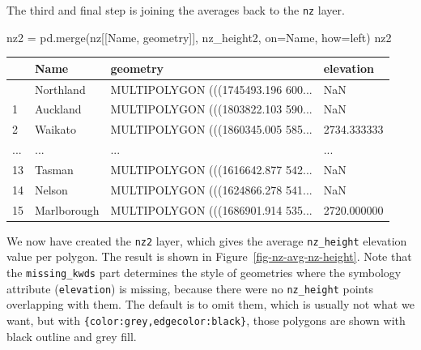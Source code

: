\documentclass[
  letterpaper,
]{krantz}
\newenvironment{Shaded}{\begin{snugshade}}{\end{snugshade}}
\newcommand{\NormalTok}[1]{\textcolor[rgb]{0.00,0.23,0.31}{#1}}
\newcommand{\OperatorTok}[1]{\textcolor[rgb]{0.37,0.37,0.37}{#1}}
\newcommand{\StringTok}[1]{\textcolor[rgb]{0.13,0.47,0.30}{#1}}
\begin{document}
The third and final step is joining the averages back to the \texttt{nz}
layer.

\begin{Shaded}
\begin{Highlighting}[]
\NormalTok{nz2 }\OperatorTok{=}\NormalTok{ pd.merge(nz[[}\StringTok{\textquotesingle{}Name\textquotesingle{}}\NormalTok{, }\StringTok{\textquotesingle{}geometry\textquotesingle{}}\NormalTok{]], nz\_height2, on}\OperatorTok{=}\StringTok{\textquotesingle{}Name\textquotesingle{}}\NormalTok{, how}\OperatorTok{=}\StringTok{\textquotesingle{}left\textquotesingle{}}\NormalTok{)}
\NormalTok{nz2}
\end{Highlighting}
\end{Shaded}

\begin{longtable}[]{@{}llll@{}}
\toprule\noalign{}
& Name & geometry & elevation \\
\midrule\noalign{}
\endhead
\bottomrule\noalign{}
\endlastfoot
0 & Northland & MULTIPOLYGON (((1745493.196 600... & NaN \\
1 & Auckland & MULTIPOLYGON (((1803822.103 590... & NaN \\
2 & Waikato & MULTIPOLYGON (((1860345.005 585... & 2734.333333 \\
... & ... & ... & ... \\
13 & Tasman & MULTIPOLYGON (((1616642.877 542... & NaN \\
14 & Nelson & MULTIPOLYGON (((1624866.278 541... & NaN \\
15 & Marlborough & MULTIPOLYGON (((1686901.914 535... & 2720.000000 \\
\end{longtable}

We now have created the \texttt{nz2} layer, which gives the average
\texttt{nz\_height} elevation value per polygon. The result is shown in
Figure~\ref{fig-nz-avg-nz-height}. Note that the \texttt{missing\_kwds}
part determines the style of geometries where the symbology attribute
(\texttt{elevation}) is missing, because there were no
\texttt{nz\_height} points overlapping with them. The default is to omit
them, which is usually not what we want, but with
\texttt{\{\textquotesingle{}color\textquotesingle{}:\textquotesingle{}grey\textquotesingle{},\textquotesingle{}edgecolor\textquotesingle{}:\textquotesingle{}black\textquotesingle{}\}},
those polygons are shown with black outline and grey fill.
\end{document}
